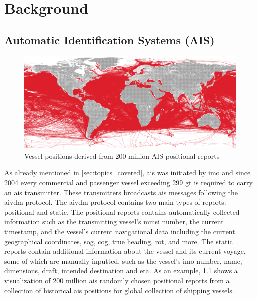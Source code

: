 \chapter{Background}

\section{Automatic Identification Systems (AIS)}

\begin{figure}[htbp]  %
    \centering
    \includegraphics[width=1.0\textwidth]{figures/ais_positions}
    \caption{Vessel positions derived from 200 million AIS positional reports}
    \label{fig:ais_positions}
\end{figure}

As already mentioned in \cref{sec:topics_covered}, \acrfull{ais} was initiated by \acrfull{imo} and since 2004 every commercial and passenger vessel exceeding 299 \acrfull{gt} is required to carry an \acrshort{ais} transmitter. These transmitters broadcasts \acrshort{ais} messages following the \gls{aivdm} protocol. The \gls{aivdm} protocol contains two main types of reports: positional and static. The positional reports contains automatically collected information such as the transmitting vessel's \acrfull{mmsi} number, the current timestamp, and the vessel's current navigational data including the current geographical coordinates, \acrfull{sog}, \acrfull{cog}, true heading, \acrfull{rot}, and more. The static reports contain additional information about the vessel and its current voyage, some of which are manually inputted, such as the vessel's \acrshort{imo} number, name, dimensions, draft, intended destination and \acrfull{eta}. As an example, \cref{fig:ais_positions} shows a visualization of 200 million \acrshort{ais} randomly chosen positional reports from a collection of historical \acrshort{ais} positions for global collection of shipping vessels.


